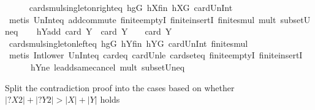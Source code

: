 \begin{isabellebody}
\ \ \ \ \isamarkupfalse%
\ card{\isacharunderscore}{\kern0pt}smul{\isacharunderscore}{\kern0pt}singleton{\isacharunderscore}{\kern0pt}right{\isacharunderscore}{\kern0pt}eq\ hgG\ hXfin\ hXG\ card{\isacharunderscore}{\kern0pt}Un{\isacharunderscore}{\kern0pt}Int\isanewline
\ \ \ \ \isamarkupfalse%
\ {\isacharparenleft}{\kern0pt}metis\ Un{\isacharunderscore}{\kern0pt}Int{\isacharunderscore}{\kern0pt}eq{\isacharparenleft}{\kern0pt}{}{\isacharparenright}{\kern0pt}\ add{\isachardot}{\kern0pt}commute\ finite{\isachardot}{\kern0pt}emptyI\ finite{\isachardot}{\kern0pt}insertI\ finite{\isacharunderscore}{\kern0pt}smul\ mult{\isacharunderscore}{\kern0pt}{}\ subset{\isacharunderscore}{\kern0pt}Un{\isacharunderscore}{\kern0pt}eq{\isacharparenright}{\kern0pt}\isanewline
\ \ \isamarkupfalse%
\ hYadd{\isacharcolon}{\kern0pt}\ {\isachardoublequoteopen}card\ {\isacharquery}{\kern0pt}Y{}\ {\isacharplus}{\kern0pt}\ card\ {\isacharquery}{\kern0pt}Y{}\ {\isacharequal}{\kern0pt}\ {}\ {\isacharasterisk}{\kern0pt}\ card\ Y{\isachardoublequoteclose}\isanewline
\ \ \ \ \isamarkupfalse%
\ card{\isacharunderscore}{\kern0pt}smul{\isacharunderscore}{\kern0pt}singleton{\isacharunderscore}{\kern0pt}left{\isacharunderscore}{\kern0pt}eq\ hgG\ hYfin\ hYG\ card{\isacharunderscore}{\kern0pt}Un{\isacharunderscore}{\kern0pt}Int\ finite{\isacharunderscore}{\kern0pt}smul\isanewline
\ \ \ \ \isamarkupfalse%
\ {\isacharparenleft}{\kern0pt}metis\ Int{\isacharunderscore}{\kern0pt}lower{}\ Un{\isacharunderscore}{\kern0pt}Int{\isacharunderscore}{\kern0pt}eq{\isacharparenleft}{\kern0pt}{}{\isacharparenright}{\kern0pt}\ card{\isacharunderscore}{\kern0pt}{}{\isacharunderscore}{\kern0pt}eq\ card{\isacharunderscore}{\kern0pt}Un{\isacharunderscore}{\kern0pt}le\ card{\isacharunderscore}{\kern0pt}seteq\ finite{\isachardot}{\kern0pt}emptyI\ finite{\isachardot}{\kern0pt}insertI\ \ \isanewline
\ \ \ \ \ \ hY{}ne\ le{\isacharunderscore}{\kern0pt}add{\isacharunderscore}{\kern0pt}same{\isacharunderscore}{\kern0pt}cancel{}\ mult{\isacharunderscore}{\kern0pt}{}\ subset{\isacharunderscore}{\kern0pt}Un{\isacharunderscore}{\kern0pt}eq{\isacharparenright}{\kern0pt}%
\begin{isamarkuptext}%
Split the contradiction proof into the cases based on whether $|?X2| + |?Y2| > |X| + |Y|$ holds%
\end{isamarkuptext}\isamarkuptrue%
\ \ \isamarkupfalse%

\end{isabellebody}
